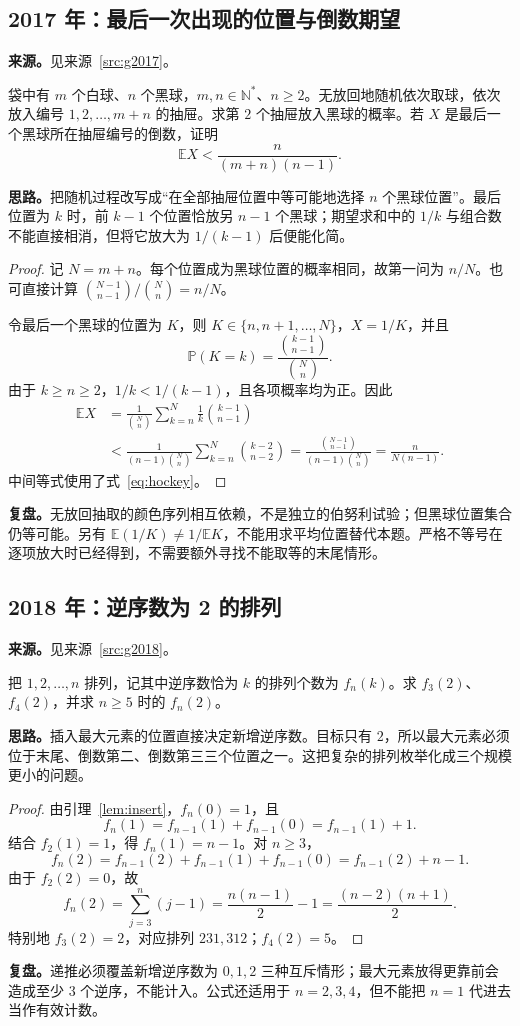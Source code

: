 \documentclass[UTF8]{ctexart}
\begin{document}
\subsection{2017 年：最后一次出现的位置与倒数期望}\label{sec:g2017}
\textbf{来源。}见来源~\ref{src:g2017}。
\begin{example}[题意重述]
袋中有 $m$ 个白球、$n$ 个黑球，$m,n\in\mathbb N^*$、$n\geq2$。无放回地随机依次取球，依次放入编号 $1,2,\ldots,m+n$ 的抽屉。求第 $2$ 个抽屉放入黑球的概率。若 $X$ 是最后一个黑球所在抽屉编号的倒数，证明
\[
\mathbb E X<\frac{n}{(m+n)(n-1)}.
\]
\end{example}
\textbf{思路。}把随机过程改写成“在全部抽屉位置中等可能地选择 $n$ 个黑球位置”。最后位置为 $k$ 时，前 $k-1$ 个位置恰放另 $n-1$ 个黑球；期望求和中的 $1/k$ 与组合数不能直接相消，但将它放大为 $1/(k-1)$ 后便能化简。
\begin{proof}
记 $N=m+n$。每个位置成为黑球位置的概率相同，故第一问为 $n/N$。也可直接计算 $\binom{N-1}{n-1}/\binom Nn=n/N$。

令最后一个黑球的位置为 $K$，则 $K\in\{n,n+1,\ldots,N\}$，$X=1/K$，并且
\[
\mathbb P(K=k)=\frac{\binom{k-1}{n-1}}{\binom Nn}.
\]
由于 $k\geq n\geq2$，$1/k<1/(k-1)$，且各项概率均为正。因此
\begin{align*}
\mathbb E X
&=\frac1{\binom Nn}\sum_{k=n}^{N}\frac1k\binom{k-1}{n-1}\\
&<\frac1{(n-1)\binom Nn}\sum_{k=n}^{N}\binom{k-2}{n-2}
=\frac{\binom{N-1}{n-1}}{(n-1)\binom Nn}
=\frac n{N(n-1)}.
\end{align*}
中间等式使用了式~\eqref{eq:hockey}。
\end{proof}
\textbf{复盘。}无放回抽取的颜色序列相互依赖，不是独立的伯努利试验；但黑球位置集合仍等可能。另有 $\mathbb E(1/K)\ne1/\mathbb E K$，不能用求平均位置替代本题。严格不等号在逐项放大时已经得到，不需要额外寻找不能取等的末尾情形。

\subsection{2018 年：逆序数为 2 的排列}\label{sec:g2018}
\textbf{来源。}见来源~\ref{src:g2018}。
\begin{example}[题意重述]
把 $1,2,\ldots,n$ 排列，记其中逆序数恰为 $k$ 的排列个数为 $f_n(k)$。求 $f_3(2)$、$f_4(2)$，并求 $n\geq5$ 时的 $f_n(2)$。
\end{example}
\textbf{思路。}插入最大元素的位置直接决定新增逆序数。目标只有 $2$，所以最大元素必须位于末尾、倒数第二、倒数第三三个位置之一。这把复杂的排列枚举化成三个规模更小的问题。
\begin{proof}
由引理~\ref{lem:insert}，$f_n(0)=1$，且
\[
f_n(1)=f_{n-1}(1)+f_{n-1}(0)=f_{n-1}(1)+1.
\]
结合 $f_2(1)=1$，得 $f_n(1)=n-1$。对 $n\geq3$，
\[
f_n(2)=f_{n-1}(2)+f_{n-1}(1)+f_{n-1}(0)
=f_{n-1}(2)+n-1.
\]
由于 $f_2(2)=0$，故
\[
f_n(2)=\sum_{j=3}^{n}(j-1)=\frac{n(n-1)}2-1
=\frac{(n-2)(n+1)}2.
\]
特别地 $f_3(2)=2$，对应排列 $231,312$；$f_4(2)=5$。
\end{proof}
\textbf{复盘。}递推必须覆盖新增逆序数为 $0,1,2$ 三种互斥情形；最大元素放得更靠前会造成至少 $3$ 个逆序，不能计入。公式还适用于 $n=2,3,4$，但不能把 $n=1$ 代进去当作有效计数。
\end{document}
